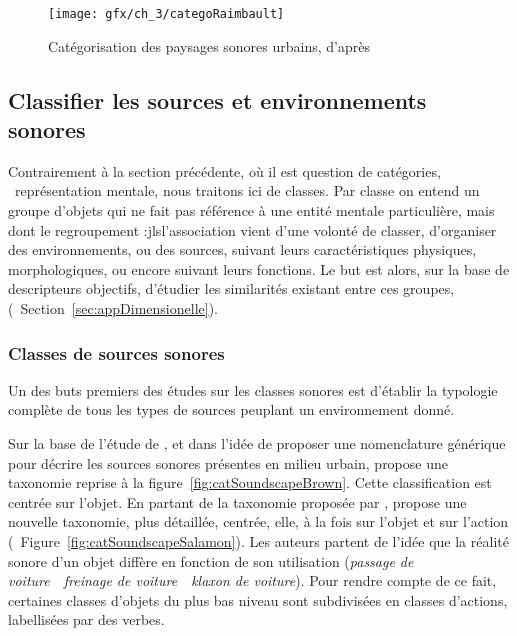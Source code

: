 {{\begin{figure}[t]
        \myfloatalign
        \texttt{[image: gfx/ch\_3/categoRaimbault]}
        \caption{Catégorisation des paysages sonores urbains, d'après \citep{raimbault2005urban}}\label{fig:catSoundscapeRaimbault}
\end{figure}

\subsection{Classifier les sources et environnements sonores}

Contrairement à la section précédente, où il est question de catégories, \ie~représentation mentale, nous traitons ici de classes. Par classe on entend un groupe d'objets qui ne fait pas référence à une entité mentale particulière, mais dont le regroupement :jls{l'association} vient d'une volonté de classer, d'organiser des environnements, ou des sources, suivant leurs caractéristiques physiques, morphologiques, ou encore suivant leurs fonctions. Le but est alors, sur la base de descripteurs objectifs, d'étudier les similarités existant entre ces groupes, (\cf~Section~\ref{sec:appDimensionelle}).


\subsubsection{Classes de sources sonores}

Un des buts premiers des études sur les classes sonores est d'établir la typologie complète de tous les types de sources peuplant un environnement donné.

Sur la base de l'étude de \citep{raimbault2005urban}, et dans l'idée de proposer une nomenclature générique pour décrire les sources sonores présentes en milieu urbain, \citep{brown2011towards} propose une taxonomie reprise à la figure~\ref{fig:catSoundscapeBrown}. Cette classification est centrée sur l'objet. En partant de la taxonomie proposée par \citep{brown2011towards}, \citep{Salamon14} propose une nouvelle taxonomie, plus détaillée, centrée, elle, à la fois sur l'objet et sur l'action (\cf~Figure~\ref{fig:catSoundscapeSalamon}). Les auteurs partent de l'idée que la réalité sonore d'un objet diffère en fonction de son utilisation (\emph{passage de voiture}~\vs~\emph{freinage de voiture}~\vs~\emph{klaxon de voiture}). Pour rendre compte de ce fait,  certaines classes d'objets du plus bas niveau sont subdivisées en classes d'actions, labellisées par des verbes.

}}
